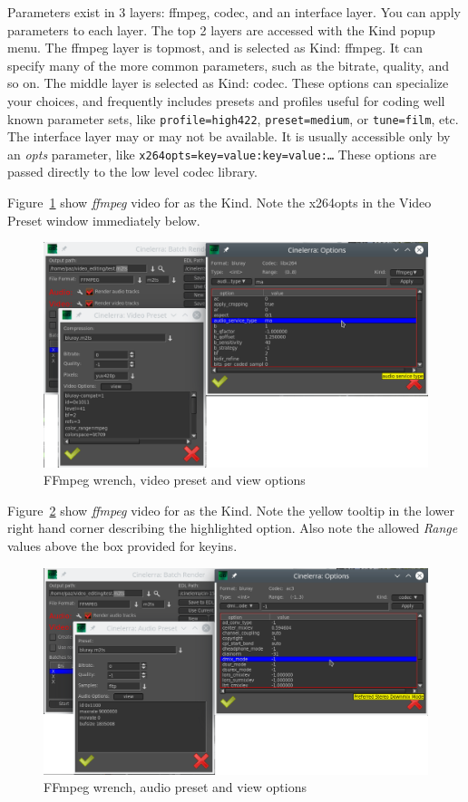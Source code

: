 Parameters exist in 3 layers: ffmpeg, codec, and an interface layer.  You can apply parameters to each layer.  The top 2 layers are accessed with the Kind popup menu. The ffmpeg layer is topmost, and is selected as Kind: ffmpeg.  It can specify many of the more common parameters, such as the bitrate, quality, and so on.  The middle layer is selected as Kind: codec.  These options can specialize your choices, and frequently includes presets and profiles useful for coding well known parameter sets, like \texttt{profile=high422}, \texttt{preset=medium}, or \texttt{tune=film}, etc.   The interface layer may or may not be available.  It is usually accessible only by an \textit{opts} parameter, like \texttt{x264opts=key=value:key=value:\dots}  These options are passed directly to the low level codec library.

Figure~\ref{fig:video-preset} show \textit{ffmpeg} video for as the Kind. Note the x264opts in the Video Preset window immediately below.

\begin{figure}[htpb]
    \centering
    \includegraphics[width=0.8\linewidth]{images/video-preset.png}
    \caption{FFmpeg wrench, video preset and view options}
    \label{fig:video-preset}
\end{figure}

Figure~\ref{fig:audio-preset02} show \textit{ffmpeg} video for as the Kind. Note the yellow tooltip in the lower right hand corner describing the highlighted option.  Also note the allowed \textit{Range} values above the box provided for keyins.

\begin{figure}[htpb]
    \centering
    \includegraphics[width=0.8\linewidth]{images/audio-preset02.png}
    \caption{FFmpeg wrench, audio preset and view options}
    \label{fig:audio-preset02}
\end{figure}

